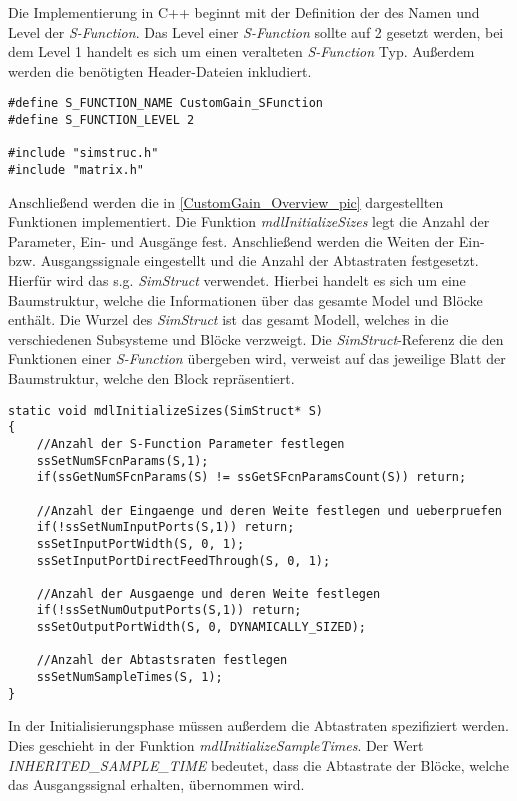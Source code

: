 Die Implementierung in C++ beginnt mit der Definition der des Namen und Level der \textit{S-Function}. Das Level einer \textit{S-Function} sollte auf 2 gesetzt werden, bei dem Level 1 handelt es sich um einen veralteten \textit{S-Function} Typ. Außerdem werden die benötigten Header-Dateien inkludiert.

\begin{lstlisting}
#define S_FUNCTION_NAME CustomGain_SFunction
#define S_FUNCTION_LEVEL 2

#include "simstruc.h"
#include "matrix.h"
\end{lstlisting}

Anschließend werden die in \ref{CustomGain_Overview_pic} dargestellten Funktionen implementiert. Die Funktion \textit{mdlInitializeSizes} legt die Anzahl der Parameter, Ein- und Ausgänge fest. Anschließend werden die Weiten der Ein- bzw. Ausgangssignale eingestellt und die Anzahl der Abtastraten festgesetzt. Hierfür wird das s.g. \textit{SimStruct} verwendet. Hierbei handelt es sich um eine Baumstruktur, welche die Informationen über das gesamte Model und Blöcke enthält. Die Wurzel des \textit{SimStruct} ist das gesamt Modell, welches in die verschiedenen Subsysteme und Blöcke verzweigt. Die \textit{SimStruct}-Referenz die den Funktionen einer \textit{S-Function} übergeben wird, verweist auf das jeweilige Blatt der Baumstruktur, welche den Block repräsentiert.

\begin{lstlisting}
static void mdlInitializeSizes(SimStruct* S)
{
    //Anzahl der S-Function Parameter festlegen
    ssSetNumSFcnParams(S,1);         
    if(ssGetNumSFcnParams(S) != ssGetSFcnParamsCount(S)) return;
    
    //Anzahl der Eingaenge und deren Weite festlegen und ueberpruefen
    if(!ssSetNumInputPorts(S,1)) return;
    ssSetInputPortWidth(S, 0, 1);
    ssSetInputPortDirectFeedThrough(S, 0, 1);
    
    //Anzahl der Ausgaenge und deren Weite festlegen
    if(!ssSetNumOutputPorts(S,1)) return;
    ssSetOutputPortWidth(S, 0, DYNAMICALLY_SIZED);
    
    //Anzahl der Abtastsraten festlegen
    ssSetNumSampleTimes(S, 1);
}
\end{lstlisting}

In der Initialisierungsphase müssen außerdem die Abtastraten spezifiziert werden. Dies geschieht in der Funktion \textit{mdlInitializeSampleTimes}. Der Wert \textit{INHERITED\_SAMPLE\_TIME} bedeutet, dass die Abtastrate der Blöcke, welche das Ausgangssignal erhalten, übernommen wird.

